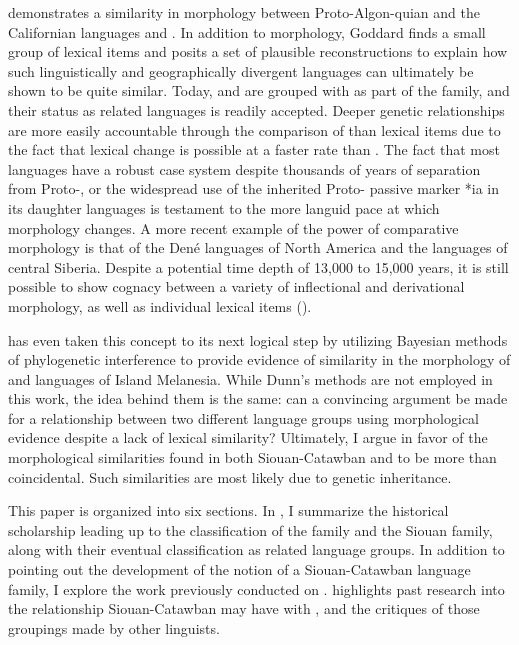 \documentclass[output=paper]{LSP/langsci}
\begin{document}
\citet{Goddard1975} demonstrates a similarity in morphology between Proto-Algon-quian and the Californian languages  and . In addition to morphology, Goddard finds a small group of lexical items and posits a set of plausible reconstructions to explain how such linguistically and geographically divergent languages can ultimately be shown to be quite similar. Today,  and  are grouped with  as part of the  family, and their status as related languages is readily accepted. Deeper genetic relationships are more easily accountable through the comparison of  than lexical items due to the fact that lexical change is possible at a faster rate than . The fact that most  languages have a robust case system despite thousands of years of separation from Proto-, or the widespread use of the inherited Proto- passive marker *ia in its daughter languages is testament to the more languid pace at which morphology changes. A more recent example of the power of comparative morphology is that of the Den\'e languages of North America and the  languages of central Siberia. Despite a potential time depth of 13,000 to 15,000 years, it is still possible to show cognacy between a variety of inflectional and derivational morphology, as well as individual lexical items (\citealt{Vajda2010}).

\citet{Dunn2009} has even taken this concept to its next logical step by utilizing Bayesian methods of phylogenetic interference to provide evidence of similarity in the morphology of  and  languages of Island Melanesia. While Dunn's methods are not employed in this work, the idea behind them is the same: can a convincing argument be made for a relationship between two different language groups using morphological evidence despite a lack of lexical similarity? Ultimately, I argue in favor of the morphological similarities found in both Siouan-Catawban and  to be more than coincidental. Such similarities are most likely due to genetic inheritance.

This paper is organized into six sections. In , I summarize the historical scholarship leading up to the classification of the  family and the Siouan family, along with their eventual classification as related language groups. In addition to pointing out the development of the notion of a Siouan-Catawban language family, I explore the work previously conducted on .  highlights past research into the relationship Siouan-Catawban may have with , and the critiques of those groupings made by other linguists. 
\end{document}
